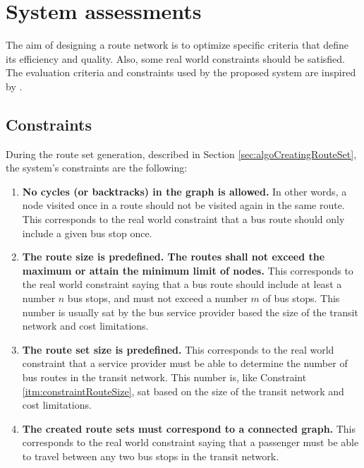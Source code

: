 \section{System assessments}
\label{sec:systemAssessments}

The aim of designing a route network is to optimize specific criteria that define its efficiency and quality. Also, some real world constraints should be satisfied. The evaluation criteria and constraints used by the proposed system are inspired by \citep{kechagiopoulos14}.

\subsection{Constraints}
\label{sec:algoConstraints}
During the route set generation, described in Section \vref{sec:algoCreatingRouteSet}, the system's constraints are the following: 
\begin{enumerate}
\item \label{itm:constraintCycles} \textbf{No cycles (or backtracks) in the graph is allowed.} In other words, a node visited once in a route should not be visited again in the same route. 
This corresponds to the real world constraint that a bus route should only include a given bus stop once. 
\item \label{itm:constraintRouteSize} \textbf{The route size is predefined. The routes shall not exceed the maximum or attain the minimum limit of nodes.}
This corresponds to the real world constraint saying that a bus route should include at least a number $n$ bus stops, and must not exceed a number $m$ of bus stops. This number is usually sat by the bus service provider based the size of the transit network and cost limitations. 
\item \label{itm:constraintRouteSetSize} \textbf{The route set size is predefined.}
This corresponds to the real world constraint that a service provider must be able to determine the number of bus routes in the transit network. This number is, like Constraint \ref{itm:constraintRouteSize}, sat based on the size of the transit network and cost limitations. 
\item \label{itm:criteriaConnectedGraph} \textbf{The created route sets must correspond to a connected graph.}
This corresponds to the real world constraint saying that a passenger must be able to travel between any two bus stops in the transit network. 
\end{enumerate}

